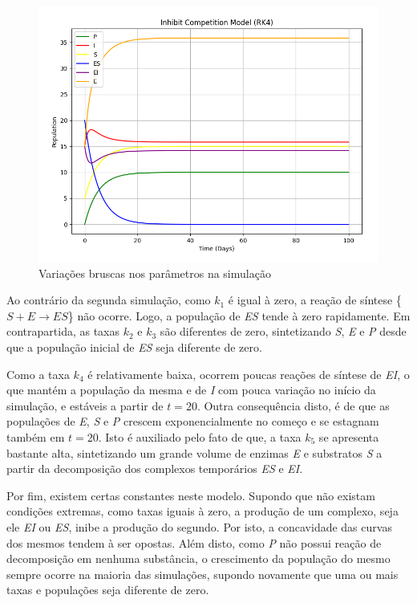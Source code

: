 \documentclass[a4paper, 12pt]{article}
\begin{document}
\begin{figure}[H]
    \centering
    \includegraphics[width=1\textwidth]{Images/Exercise 3/ei.png}
    \vspace*{-1cm}
    \caption{Variações bruscas nos parâmetros na simulação}
    \label{fig:exampleFig12}
\end{figure}

Ao contrário da segunda simulação, como \(k_1\) é igual à zero, a reação de síntese \{\(S + E \rightarrow  ES\)\} não ocorre. Logo, a população de \emph{ES} tende à zero rapidamente. Em contrapartida, as taxas \(k_2\) e \(k_3\) são diferentes de zero, sintetizando \emph{S}, \emph{E} e \emph{P} desde que a população inicial de \emph{ES} seja diferente de zero.

Como a taxa \(k_4\) é relativamente baixa, ocorrem poucas reações de síntese de \emph{EI}, o que mantém a população da mesma e de \emph{I} com pouca variação no início da simulação, e estáveis a partir de \(t = 20\). Outra consequência disto, é de que as populações de \emph{E}, \emph{S} e \emph{P} crescem exponencialmente no começo e se estagnam também em \(t = 20\). Isto é auxiliado pelo fato de que, a taxa \(k_5\) se apresenta bastante alta, sintetizando um grande volume de enzimas \emph{E} e substratos \emph{S} a partir da decomposição dos complexos temporários \emph{ES} e \emph{EI}.

Por fim, existem certas constantes neste modelo. Supondo que não existam condições extremas, como taxas iguais à zero, a produção de um complexo, seja ele \emph{EI} ou \emph{ES}, inibe a produção do segundo. Por isto, a concavidade das curvas dos mesmos tendem à ser opostas. Além disto, como \emph{P} não possui reação de decomposição em nenhuma substância, o crescimento da população do mesmo sempre ocorre na maioria das simulações, supondo novamente que uma ou mais taxas e populações seja diferente de zero. 
 
\end{document}
